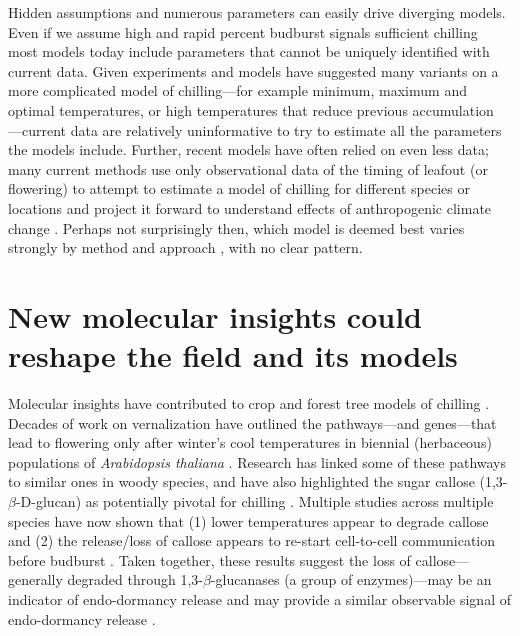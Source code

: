 \documentclass[11pt]{article}
\begin{document}
Hidden assumptions and numerous parameters can easily drive diverging models. Even if we assume high and rapid percent budburst signals sufficient chilling most models today include parameters that cannot be uniquely identified with current data.  Given experiments and models have suggested many variants on a more complicated model of chilling---for example minimum, maximum and optimal temperatures, or high temperatures that reduce previous accumulation \citep[Fig. \ref{fig:modelsketch},][]{lued2011,luedeling2012chilling,chuine2016}---current data are relatively uninformative to try to estimate all the parameters the models include. Further, recent models have often relied on even less data; many current methods use only observational data of the timing of leafout (or flowering) to attempt to estimate a model of chilling for different species or locations and project it forward to understand effects of anthropogenic climate change \citep{lued2011,luedeling2012chilling,gao2024}. Perhaps not surprisingly then, which model is deemed best varies strongly by method and approach \citep{Caffarra:2011qf,basler2016evaluating,hufkens2018integrated}, with no clear pattern. 


\section*{New molecular insights could reshape the field and its models} 

Molecular insights have contributed to crop and forest tree models of chilling \citep{chuinearees}. Decades of work on vernalization have outlined the pathways---and genes---that lead to flowering only after winter's cool temperatures in biennial (herbaceous) populations of \emph{Arabidopsis thaliana} \citep[Fig. \ref{fig:molecular},][]{Wilczek:2009oa,kim2009vernalization}. Research has linked some of these pathways to similar ones in woody species, and have also highlighted the sugar callose (1,3-$\beta$-{\sc D}-glucan) as potentially pivotal for chilling \citep{vanderschoot2014,pan2021aba}. Multiple studies across multiple species have now shown that (1) lower temperatures appear to degrade callose and (2) the release/loss of callose appears to re-start cell-to-cell communication before budburst \citep{vanderschoot2014}. Taken together, these results suggest the loss of callose---generally degraded through 1,3-$\beta$-glucanases (a group of enzymes)---may be an indicator of endo-dormancy release \citep[though other factors, such as  ABA, also often change at the same time,][]{tylewicz2018photoperiodic,pan2021aba} and may provide a similar observable signal of endo-dormancy release \citep{rinne2018,andre2022populus}. 
\end{document}
